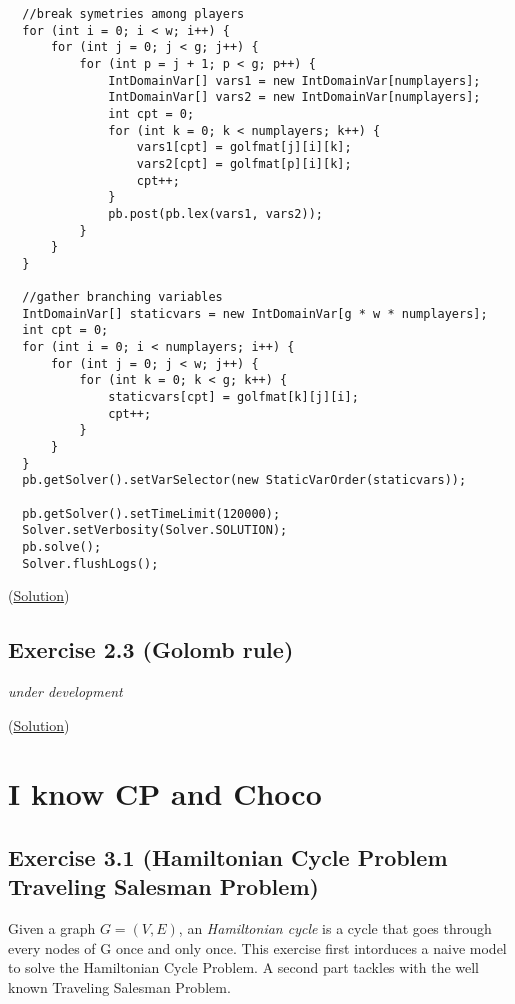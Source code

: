 \begin{lstlisting}
  //break symetries among players
  for (int i = 0; i < w; i++) {
      for (int j = 0; j < g; j++) {
          for (int p = j + 1; p < g; p++) {
              IntDomainVar[] vars1 = new IntDomainVar[numplayers];
              IntDomainVar[] vars2 = new IntDomainVar[numplayers];
              int cpt = 0;
              for (int k = 0; k < numplayers; k++) {
                  vars1[cpt] = golfmat[j][i][k];
                  vars2[cpt] = golfmat[p][i][k];
                  cpt++;
              }
              pb.post(pb.lex(vars1, vars2));
          }
      }
  }
	
  //gather branching variables
  IntDomainVar[] staticvars = new IntDomainVar[g * w * numplayers];
  int cpt = 0;
  for (int i = 0; i < numplayers; i++) {
      for (int j = 0; j < w; j++) {
          for (int k = 0; k < g; k++) {
              staticvars[cpt] = golfmat[k][j][i];
              cpt++;
          }
      }
  }
  pb.getSolver().setVarSelector(new StaticVarOrder(staticvars));
	
  pb.getSolver().setTimeLimit(120000);
  Solver.setVerbosity(Solver.SOLUTION);
  pb.solve();
  Solver.flushLogs();
\end{lstlisting}

(\hyperlink{solutions:solutionofexercise2.2}{Solution})

\subsection{Exercise 2.3 (Golomb rule)}\label{exercises:exercise2.3}\hypertarget{exercises:exercise2.3}{}

\emph{under development}

(\hyperlink{solutions:solutionofexercise2.3}{Solution})

\section{I know CP and Choco}\label{exercises:iknowcpandchoco}\hypertarget{exercises:iknowcpandchoco}{}

\subsection{Exercise 3.1 (Hamiltonian Cycle Problem Traveling Salesman Problem)}\label{exercises:exercise3.1}\hypertarget{exercises:exercise3.1}{}

Given a graph $G = (V,E)$, an \emph{Hamiltonian cycle} is a cycle that goes through every nodes of G once and only once. This exercise first intorduces a naive model to solve the Hamiltonian Cycle Problem. A second part tackles with the well known Traveling Salesman Problem.


